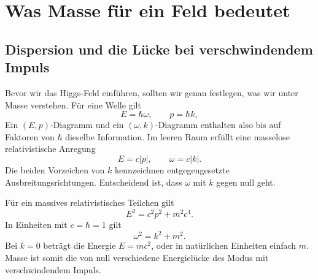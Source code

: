 \section{Was Masse für ein Feld bedeutet}

\subsection{Dispersion und die Lücke bei verschwindendem Impuls}

Bevor wir das Higgs-Feld einführen, sollten wir genau festlegen, was wir unter Masse verstehen. Für eine Welle gilt
\begin{equation}
  E=\hbar\omega,
  \qquad
  p=\hbar k,
  \label{eq:l08-quantum-wave}
\end{equation}
Ein \((E,p)\)-Diagramm und ein \((\omega,k)\)-Diagramm enthalten also bis auf Faktoren von \(\hbar\) dieselbe Information. Im leeren Raum erfüllt eine masselose relativistische Anregung
\begin{equation}
  E=c|p|,
  \qquad
  \omega=c|k|.
  \label{eq:l08-massless-dispersion}
\end{equation}
Die beiden Vorzeichen von \(k\) kennzeichnen entgegengesetzte Ausbreitungsrichtungen. Entscheidend ist, dass \(\omega\) mit \(k\) gegen null geht.

Für ein massives relativistisches Teilchen gilt
\begin{equation}
  E^2=c^2p^2+m^2c^4.
  \label{eq:l08-massive-dispersion}
\end{equation}
In Einheiten mit \(c=\hbar=1\) gilt
\begin{equation}
  \omega^2=k^2+m^2.
\end{equation}
Bei \(k=0\) beträgt die Energie \(E=mc^2\), oder in natürlichen Einheiten einfach \(m\). Masse ist somit die von null verschiedene Energielücke des Modus mit verschwindendem Impuls.

